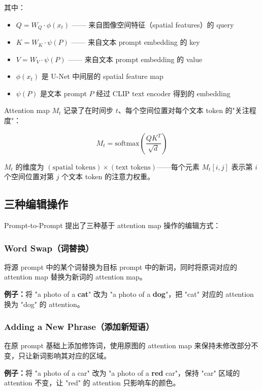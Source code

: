 \documentclass[11pt,a4paper]{article}
\theoremstyle{definition}
\begin{document}
其中：
\begin{itemize}
    \item $Q = W_Q \cdot \phi(x_t)$ —— 来自图像空间特征（spatial features）的 query
    \item $K = W_K \cdot \psi(P)$ —— 来自文本 prompt embedding 的 key
    \item $V = W_V \cdot \psi(P)$ —— 来自文本 prompt embedding 的 value
    \item $\phi(x_t)$ 是 U-Net 中间层的 spatial feature map
    \item $\psi(P)$ 是文本 prompt $P$ 经过 CLIP text encoder 得到的 embedding
\end{itemize}

Attention map $M_t$ 记录了在时间步 $t$、每个空间位置对每个文本 token 的"关注程度"：

\begin{equation}\label{eq:attention_map}
    M_t = \text{softmax}\!\left(\frac{Q K^T}{\sqrt{d}}\right)
\end{equation}

$M_t$ 的维度为 $(\text{spatial tokens}) \times (\text{text tokens})$——每个元素 $M_t[i, j]$ 表示第 $i$ 个空间位置对第 $j$ 个文本 token 的注意力权重。

\subsection{三种编辑操作}

Prompt-to-Prompt 提出了三种基于 attention map 操作的编辑方式：

\subsubsection{Word Swap（词替换）}

将源 prompt 中的某个词替换为目标 prompt 中的新词，同时将原词对应的 attention map 替换为新词的 attention map。

\textbf{例子：}将 "a photo of a \textbf{cat}" 改为 "a photo of a \textbf{dog}"，把 "cat" 对应的 attention 换为 "dog" 的 attention。

\subsubsection{Adding a New Phrase（添加新短语）}

在原 prompt 基础上添加修饰词，使用原图的 attention map 来保持未修改部分不变，只让新词影响其对应的区域。

\textbf{例子：}将 "a photo of a car" 改为 "a photo of a \textbf{red} car"，保持 "car" 区域的 attention 不变，让 "red" 的 attention 只影响车的颜色。
\end{document}
